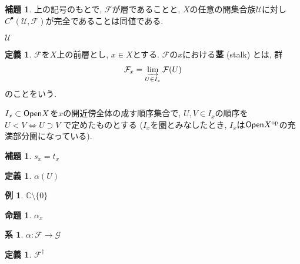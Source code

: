 \documentclass[12pt, a4paper, dvipdfmx]{jsarticle}
\makeatletter
\theoremstyle{definition}
\newtheorem{Definition}[Axiom]{定義}
\newtheorem{Proposition}[Axiom]{命題}
\newtheorem{Lemma}[Axiom]{補題}
\newtheorem{Corollary}[Axiom]{系}
\newtheorem{Example}[Axiom]{例}
\newcommand{\C}{\mathbb{C}}
\newcommand{\F}{\mathcal{F}}
\newcommand{\mcal}{\mathcal}
\numberwithin{equation}{section} %
\newcommand{\op}{{\rm op}} %
\newcommand{\cat}[1]{\textup{\textsf{#1}}}%
\renewenvironment{proof}[1][\proofname]{\par
  \normalfont
  \topsep6\p@\@plus6\p@ \trivlist
  \item[\hskip\labelsep{\textbf{#1}}\@addpunct{\textbf{. }}]\ignorespaces
}{%
  \endtrivlist
}
\renewcommand{\proofname}{証明}
\makeatother
\begin{document}
\begin{Lemma} \label{lem-shCmp}
    上の記号のもとで, $\F$が層であることと,
    $X$の任意の開集合族$\mcal{U}$に対し
    $C^\bullet(\mcal{U},\F)$が完全であることは同値である. 
\end{Lemma}

\begin{proof}
    $\mcal{U}$
\end{proof}

\begin{Definition} \label{def-stalk}
    $\F$を$X$上の前層とし, $x\in X$とする. 
    $\F$の$x$における\textbf{茎} (stalk) とは, 
    群
    \begin{align*}
        \F_x = \varinjlim_{U\in I_x} \F(U)
    \end{align*}
    のことをいう. 
\end{Definition}

\begin{proof}[$I_x$について]
    $I_x\subset \cat{Open}X$を$x$の開近傍全体の成す順序集合で, 
    $U, V \in I_x$の順序を
    $U < V \Longleftrightarrow U \supset V$
    で定めたものとする ($I_x$を圏とみなしたとき, 
    $I_x$は$\cat{Open}X^\op$の充満部分圏になっている).     
\end{proof}

\begin{Lemma}
    $s_x = t_x$
\end{Lemma}

\begin{Definition} \label{def-morPsh}
    $\alpha(U)$
\end{Definition}

\begin{Example}
    $\C \setminus \{0\}$
\end{Example}

\begin{Proposition}
    $\alpha_x$
\end{Proposition}

\begin{Corollary}
    $\alpha\colon \F \to \mcal{G}$
\end{Corollary}

\begin{Definition} \label{def-shfify}
    $\F^\dagger$
\end{Definition}

\begin{comment}
    \begin{equation*}
        \vcenter{\xymatrix@C=36pt{
        0 \ar[r] 
        & 
        \F(Y) \ar[r]^-{d_0} 
        & 
        \prod_i \F(U_i) \ar[r]^-{d_1} 
        & \prod_{i,j} \F(U_{ij}),
        }}
    \end{equation*}
\end{comment}
\end{document}
